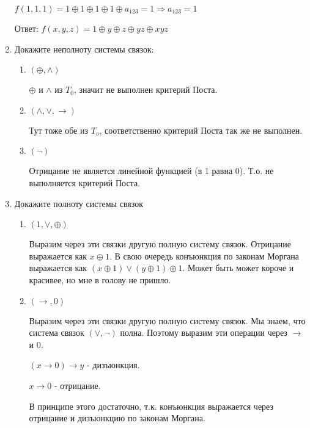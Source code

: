 \documentclass{article}
\begin{document}
\begin{enumerate}
$f(1, 1, 1) = 1 \oplus 1 \oplus 1 \oplus 1 \oplus a_{123} = 1
\Rightarrow a_{123} = 1$

Ответ: $f(x,y,z) = 1 \oplus y \oplus z \oplus yz \oplus xyz$

\item Докажите неполноту системы связок:

  \begin{enumerate}
  \item $(\oplus, \land)$

    $\oplus$ и $\land$ из $T_{0}$, значит не выполнен критерий Поста.

  \item $(\land, \lor, \to)$

    Тут тоже обе из $T_{o}$, соответственно критерий Поста так же не выполнен.
  \item $(\neg)$

    Отрицание не является линейной функцией (в 1 равна 0). Т.о. не
    выполняется критерий Поста.
  \end{enumerate}

\item Докажите полноту системы связок
  \begin{enumerate}
    \item $(1, \lor, \oplus)$

      Выразим через эти связки другую полную систему связок. Отрицание
      выражается как $x \oplus 1$. В свою очередь конъюнкция по
      законам Моргана выражается как $(x \oplus 1) \lor (y \oplus 1)
      \oplus 1$. Может быть может короче и красивее, но мне в голову
      не пришло.
    \item $(\to, 0)$

      Выразим через эти связки другую полную систему связок. Мы знаем,
      что система связок $(\lor, \neg)$ полна. Поэтому выразим эти
      операции через $\to$ и $0$.

      $(x \to 0) \to y$ - дизъюнкция.

      $x \to 0$ - отрицание.

      В принципе этого достаточно, т.к. конъюнкция выражается через
      отрицание и дизъюнкцию по законам Моргана.
  \end{enumerate}
\end{enumerate}
\end{document}
